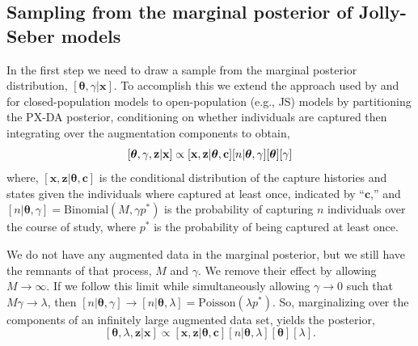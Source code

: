 \documentclass[11pt]{article}
\newcommand{\bx}{\ensuremath{\mathbf{x}}}
\newcommand{\bc}{\ensuremath{\mathbf{c}}}
\newcommand{\bz}{\ensuremath{\mathbf{z}}}
\newcommand{\bt}{\ensuremath{\boldsymbol{\theta}}}
\begin{document}
\subsection{Sampling from the marginal posterior of Jolly-Seber models}

In the first step we need to draw a sample from the marginal posterior distribution, $[\bt,\gamma|\bx]$. To accomplish this we extend the approach used by \cite{king2015capture} and \cite{Hooten:2023aa} for closed-population models to open-population (e.g., JS) models by partitioning the PX-DA posterior, conditioning on whether individuals are captured then integrating over the augmentation components to obtain,
\[
\relax[\bt,\gamma, \bz|\bx] \propto [\bx,\bz|\bt,\bc] [n|\bt,\gamma][\bt][\gamma]
\]
where, $[\bx,\bz|\bt,\bc]$ is the conditional distribution of the capture histories and states given the individuals where captured at least once, indicated by ``$\bc$,'' and $[n|\bt,\gamma] = \text{Binomial}(M, \gamma p^*)$ is the probability of capturing $n$ individuals over the course of study, where $p^*$ is the probability of being captured at least once. 

We do not have any augmented data in the marginal posterior, but we still have the remnants of that process, $M$ and $\gamma$. We remove their effect by allowing $M\to \infty$. If we follow this limit while simultaneously allowing $\gamma \to 0$ such that $M\gamma \to \lambda$, then  $[n|\bt,\gamma] \to [n|\bt,\lambda] = \text{Poisson}(\lambda p^*)$.  So, marginalizing over the components of an infinitely large augmented data set, yields the posterior,
\[
[\bt,\lambda, \bz|\bx] \propto  [\bx,\bz|\bt,\bc][n|\bt, \lambda][\bt][\lambda].
\]
\end{document}
